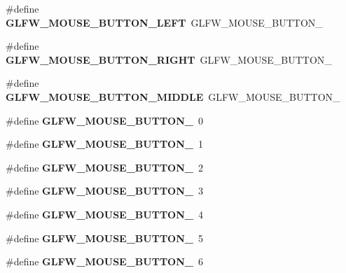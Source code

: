 \begin{DoxyCompactItemize}
\#define {\bfseries G\+L\+F\+W\+\_\+\+M\+O\+U\+S\+E\+\_\+\+B\+U\+T\+T\+O\+N\+\_\+\+L\+E\+FT}~G\+L\+F\+W\+\_\+\+M\+O\+U\+S\+E\+\_\+\+B\+U\+T\+T\+O\+N\+\_
\item 
\mbox{\label{group__buttons_ga3e2f2cf3c4942df73cc094247d275e74}} 
\#define {\bfseries G\+L\+F\+W\+\_\+\+M\+O\+U\+S\+E\+\_\+\+B\+U\+T\+T\+O\+N\+\_\+\+R\+I\+G\+HT}~G\+L\+F\+W\+\_\+\+M\+O\+U\+S\+E\+\_\+\+B\+U\+T\+T\+O\+N\+\_
\item 
\mbox{\label{group__buttons_ga34a4d2a701434f763fd93a2ff842b95a}} 
\#define {\bfseries G\+L\+F\+W\+\_\+\+M\+O\+U\+S\+E\+\_\+\+B\+U\+T\+T\+O\+N\+\_\+\+M\+I\+D\+D\+LE}~G\+L\+F\+W\+\_\+\+M\+O\+U\+S\+E\+\_\+\+B\+U\+T\+T\+O\+N\+\_
\item 
\mbox{\label{group__buttons_ga181a6e875251fd8671654eff00f9112e}} 
\#define {\bfseries G\+L\+F\+W\+\_\+\+M\+O\+U\+S\+E\+\_\+\+B\+U\+T\+T\+O\+N\+\_}~0
\item 
\mbox{\label{group__buttons_ga604b39b92c88ce9bd332e97fc3f4156c}} 
\#define {\bfseries G\+L\+F\+W\+\_\+\+M\+O\+U\+S\+E\+\_\+\+B\+U\+T\+T\+O\+N\+\_}~1
\item 
\mbox{\label{group__buttons_ga0130d505563d0236a6f85545f19e1721}} 
\#define {\bfseries G\+L\+F\+W\+\_\+\+M\+O\+U\+S\+E\+\_\+\+B\+U\+T\+T\+O\+N\+\_}~2
\item 
\mbox{\label{group__buttons_ga53f4097bb01d5521c7d9513418c91ca9}} 
\#define {\bfseries G\+L\+F\+W\+\_\+\+M\+O\+U\+S\+E\+\_\+\+B\+U\+T\+T\+O\+N\+\_}~3
\item 
\mbox{\label{group__buttons_gaf08c4ddecb051d3d9667db1d5e417c9c}} 
\#define {\bfseries G\+L\+F\+W\+\_\+\+M\+O\+U\+S\+E\+\_\+\+B\+U\+T\+T\+O\+N\+\_}~4
\item 
\mbox{\label{group__buttons_gae8513e06aab8aa393b595f22c6d8257a}} 
\#define {\bfseries G\+L\+F\+W\+\_\+\+M\+O\+U\+S\+E\+\_\+\+B\+U\+T\+T\+O\+N\+\_}~5
\item 
\mbox{\label{group__buttons_ga8b02a1ab55dde45b3a3883d54ffd7dc7}} 
\#define {\bfseries G\+L\+F\+W\+\_\+\+M\+O\+U\+S\+E\+\_\+\+B\+U\+T\+T\+O\+N\+\_}~6

\end{DoxyCompactItemize}
